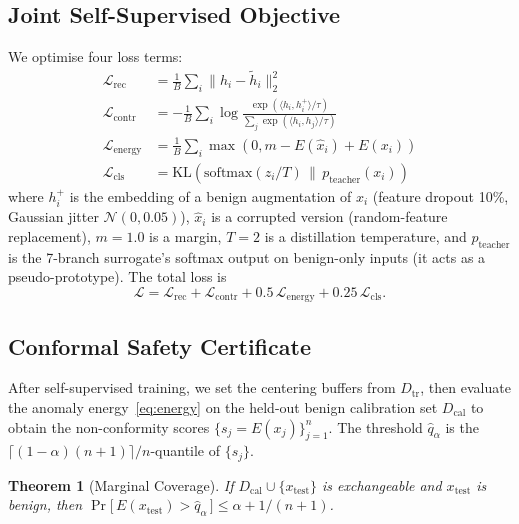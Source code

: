 \documentclass[journal,twoside]{IEEEtran}
\newtheorem{theorem}{Theorem}
\begin{document}
\subsection{Joint Self-Supervised Objective}
\label{sec:method:obj}
We optimise four loss terms:
\begin{align}
  \mathcal{L}_\text{rec}    &= \tfrac{1}{B} \sum_i \| h_i - \tilde{h}_i \|_2^2 \\
  \mathcal{L}_\text{contr}  &= -\tfrac{1}{B} \sum_i \log \frac{\exp(\langle h_i, h_i^{+} \rangle/\tau)}{\sum_j \exp(\langle h_i, h_j \rangle/\tau)} \\
  \mathcal{L}_\text{energy} &= \tfrac{1}{B} \sum_i \max(0, m - E(\hat{x}_i) + E(x_i)) \\
  \mathcal{L}_\text{cls}    &= \mathrm{KL}(\mathrm{softmax}(z_i / T) \,\|\, p_{\text{teacher}}(x_i))
  \label{eq:loss-cls}
\end{align}
where $h_i^{+}$ is the embedding of a benign augmentation of $x_i$
(feature dropout 10\%, Gaussian jitter $\mathcal{N}(0, 0.05)$),
$\hat{x}_i$ is a corrupted version (random-feature replacement),
$m{=}1.0$ is a margin, $T{=}2$ is a distillation temperature, and
$p_{\text{teacher}}$ is the 7-branch surrogate's softmax output on
benign-only inputs (it acts as a pseudo-prototype).
The total loss is
\begin{equation}
  \mathcal{L} = \mathcal{L}_\text{rec} + \mathcal{L}_\text{contr} + 0.5\,\mathcal{L}_\text{energy} + 0.25\,\mathcal{L}_\text{cls}.
\end{equation}

\subsection{Conformal Safety Certificate}
\label{sec:method:certify}
After self-supervised training, we set the centering buffers from
$D_\text{tr}$, then evaluate the anomaly energy~\eqref{eq:energy} on
the held-out benign calibration set $D_\text{cal}$ to obtain the
non-conformity scores $\{s_j = E(x_j)\}_{j=1}^n$.  The threshold
$\hat{q}_\alpha$ is the
$\lceil (1{-}\alpha)(n{+}1) \rceil/n$-quantile of $\{s_j\}$.

\begin{theorem}[Marginal Coverage]
  \label{thm:coverage}
  If $D_\text{cal} \cup \{x_\text{test}\}$ is exchangeable and
  $x_\text{test}$ is benign, then
  $\Pr\big[\,E(x_\text{test}) > \hat{q}_\alpha\,\big] \le \alpha + 1/(n{+}1)$.
\end{theorem}
\end{document}
